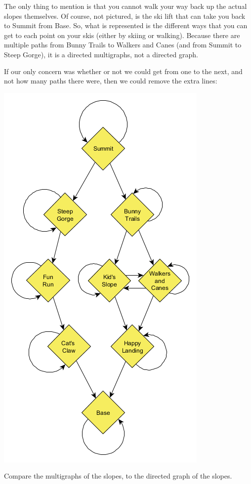 The only thing to mention is that you cannot walk your way back up the actual slopes themselves. Of course, not pictured, is the ski lift that can take you back to Summit from Base. So, what is represented is the different ways that you can get to each point on your skis (either by skiing or walking). Because there are multiple paths from Bunny Trails to Walkers and Canes (and from Summit to Steep Gorge), it is a directed multigraphs, not a directed graph.

If our only concern was whether or not we could get from one to the next, and not how many paths there were, then we could remove the extra lines:

\includegraphics{01/slopes2.png}

Compare the multigraphs of the slopes, to the directed graph of the slopes.

